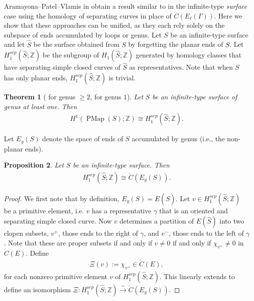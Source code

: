 \documentclass[11pt]{amsart}
\theoremstyle{plain}
\newtheorem{THM}{Theorem}[section]
\newtheorem{PROP}[THM]{Proposition}
\theoremstyle{definition}
\DeclareMathOperator{\PMap}{PMap}
\newcommand{\Z}{\mathbb{Z}}
\def\G{{\Gamma}}
\newcommand{\defeq}{:=}
\newcommand{\<}{\langle}
\renewcommand{\>}{\rangle}
\newcommand{\dC}{\mathring{C}}
\begin{document}
Aramayona--Patel--Vlamis in \cite{APV2020} obtain a result similar to  in the infinite-type \emph{surface} case using the homology of separating curves in place of $\dC(E_{\ell}(\G))$. Here we show that these approaches can be unified, as they each rely solely on the subspace of ends accumulated by loops or genus. Let $S$ be an infinite-type surface and let $\hat{S}$ be the surface obtained from $S$ by forgetting the planar ends of $S$. Let $H_{1}^{sep}(\hat{S};\Z)$ be the subgroup of $H_{1}(\hat{S};\Z)$ generated by homology classes that have separating simple closed curves of $\hat{S}$ as representatives. Note that when $S$ has only planar ends, $H_{1}^{sep}(\hat{S};\Z)$ is trivial. 

\begin{THM}[{\cite[Theorem 4]{APV2020} for genus $\geq 2$, \cite[Theorem 1.1]{DP2020} for genus $1$}]\label{thm:apvcohom}
    Let $S$ be an infinite-type surface of genus at least one. Then 
    \begin{align*}
        H^{1}(\PMap(S);\Z) \cong H_{1}^{sep}(\hat{S};\Z).
    \end{align*}
\end{THM}

Let $E_{g}(S)$ denote the space of ends of $S$ accumulated by genus (i.e., the non-planar ends). 

\begin{PROP}\label{prop:sephomend}
    Let $S$ be an infinite-type surface. Then 
    \begin{align*}
        H_{1}^{sep}(\hat{S};\Z) \cong \dC(E_{g}(S)). 
    \end{align*}
\end{PROP}

\begin{proof}
    We first note that by definition, $E_{g}(S) = E(\hat{S})$. Let $v \in H_{1}^{sep}(\hat{S};\Z)$ be a primitive element, i.e. $v$ has a representative $\gamma$ that is an oriented and separating simple closed curve. Now $v$ determines a partition of $E(\hat{S})$ into two clopen subsets, $v^{+}$, those ends to the right of $\gamma$, and $v^{-}$, those ends to the left of $\gamma$. Note that these are proper subsets if and only if $v \neq 0$ if and only if $\chi_{v^+} \neq 0$ in $\dC(E)$. Define 
    \begin{align*}
        \Xi(v) \defeq \chi_{v^{+}} \in \dC(E),
    \end{align*}
    for each nonzero primitive element $v$ of $H_1^{sep}(\hat{S};\Z)$.
    This linearly extends to define an isomorphism $\Xi: H_{1}^{sep}(\hat{S};\Z) \xrightarrow{\sim} \dC(E_{g}(S))$.
\end{proof}
\end{document}
